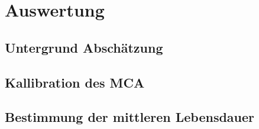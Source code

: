 \section{Auswertung}
\subsection{Untergrund Abschätzung}
\subsection{Kallibration des MCA}
\subsection{Bestimmung der mittleren Lebensdauer}
